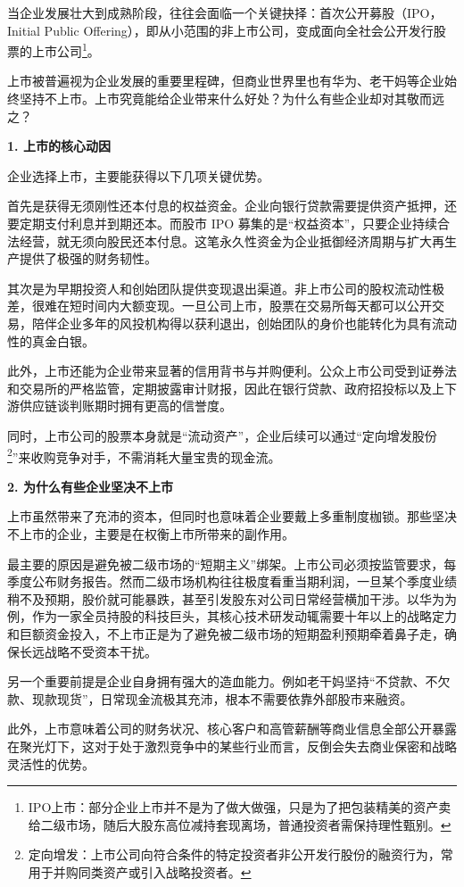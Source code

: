 \documentclass[12pt,openany]{book}
\newcommand{\subhead}[1]{%
    \par\vspace{0.5\baselineskip}%
    \noindent\textbf{#1}\par%
    \vspace{0.5\baselineskip}%
}
\begin{document}
当企业发展壮大到成熟阶段，往往会面临一个关键抉择：首次公开募股（IPO，Initial Public Offering），即从小范围的非上市公司，变成面向全社会公开发行股票的上市公司\footnote{IPO上市：部分企业上市并不是为了做大做强，只是为了把包装精美的资产卖给二级市场，随后大股东高位减持套现离场，普通投资者需保持理性甄别。}。

上市被普遍视为企业发展的重要里程碑，但商业世界里也有华为、老干妈等企业始终坚持不上市。上市究竟能给企业带来什么好处？为什么有些企业却对其敬而远之？

\subhead{1. 上市的核心动因}

企业选择上市，主要能获得以下几项关键优势。

首先是获得无须刚性还本付息的权益资金。企业向银行贷款需要提供资产抵押，还要定期支付利息并到期还本。而股市 IPO 募集的是“权益资本”，只要企业持续合法经营，就无须向股民还本付息。这笔永久性资金为企业抵御经济周期与扩大再生产提供了极强的财务韧性。

其次是为早期投资人和创始团队提供变现退出渠道。非上市公司的股权流动性极差，很难在短时间内大额变现。一旦公司上市，股票在交易所每天都可以公开交易，陪伴企业多年的风投机构得以获利退出，创始团队的身价也能转化为具有流动性的真金白银。

此外，上市还能为企业带来显著的信用背书与并购便利。公众上市公司受到证券法和交易所的严格监管，定期披露审计财报，因此在银行贷款、政府招投标以及上下游供应链谈判账期时拥有更高的信誉度。

同时，上市公司的股票本身就是“流动资产”，企业后续可以通过“定向增发股份\footnote{定向增发：上市公司向符合条件的特定投资者非公开发行股份的融资行为，常用于并购同类资产或引入战略投资者。}”来收购竞争对手，不需消耗大量宝贵的现金流。

\subhead{2. 为什么有些企业坚决不上市}

上市虽然带来了充沛的资本，但同时也意味着企业要戴上多重制度枷锁。那些坚决不上市的企业，主要是在权衡上市所带来的副作用。

最主要的原因是避免被二级市场的“短期主义”绑架。上市公司必须按监管要求，每季度公布财务报告。然而二级市场机构往往极度看重当期利润，一旦某个季度业绩稍不及预期，股价就可能暴跌，甚至引发股东对公司日常经营横加干涉。以华为为例，作为一家全员持股的科技巨头，其核心技术研发动辄需要十年以上的战略定力和巨额资金投入，不上市正是为了避免被二级市场的短期盈利预期牵着鼻子走，确保长远战略不受资本干扰。

另一个重要前提是企业自身拥有强大的造血能力。例如老干妈坚持“不贷款、不欠款、现款现货”，日常现金流极其充沛，根本不需要依靠外部股市来融资。

此外，上市意味着公司的财务状况、核心客户和高管薪酬等商业信息全部公开暴露在聚光灯下，这对于处于激烈竞争中的某些行业而言，反倒会失去商业保密和战略灵活性的优势。
\end{document}
